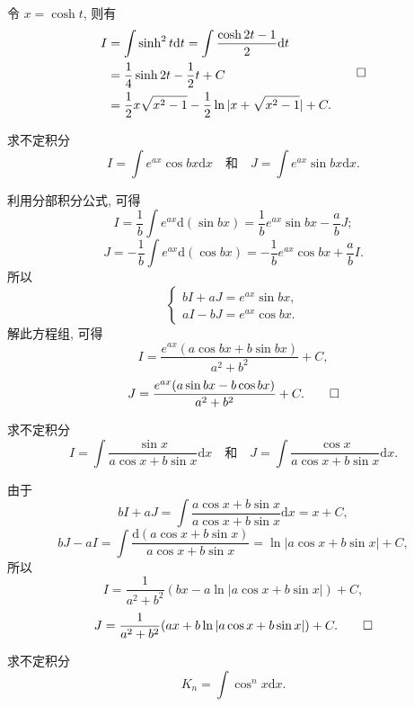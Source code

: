 \begin{solve}[{解法 2}]
令 $x=\cosh t$, 则有
\[
\begin{aligned}
  I
  &=
  \int\sinh^2t\mathrm dt
  =
  \int\frac{\cosh2t-1}{2}\mathrm dt\\
  &=
  \frac14\sinh2t-\frac12t+C\\
  &=
  \frac12x\sqrt{x^2-1}-\frac12\ln|x+\sqrt{x^2-1}|+C.
\end{aligned}
\qedhere
\]
\end{solve}


\begin{example}\label{example:ma-6-2-22}
求不定积分
\[
  I=\int e^{ax}\cos bx\mathrm dx
  \quad\text{和}\quad
  J=\int e^{ax}\sin bx\mathrm dx.
\]
\end{example}


\begin{solve}
利用分部积分公式, 可得
\[
  I=\frac1b\int e^{ax}\mathrm d(\sin bx)
  =
  \frac1be^{ax}\sin bx-\frac abJ;
\]
\[
  J=-\frac1b\int e^{ax}\mathrm d(\cos bx)
  =
  -\frac1be^{ax}\cos bx+\frac abI.
\]
所以
\[
  \begin{cases}
    bI+aJ=e^{ax}\sin bx,\\
    aI-bJ=e^{ax}\cos bx.
  \end{cases}
\]
解此方程组, 可得
\[
  I=\frac{e^{ax}(a\cos bx+b\sin bx)}{a^2+b^2}+C,
\]
\[
  J=\frac{e^{ax}(a\sin bx-b\cos bx)}{a^2+b^2}+C.
\qedhere
\]
\end{solve}


\begin{example}\label{example:ma-6-2-23}
求不定积分
\[
  I=\int\frac{\sin x}{a\cos x+b\sin x}\mathrm dx
  \quad\text{和}\quad
  J=\int\frac{\cos x}{a\cos x+b\sin x}\mathrm dx.
\]
\end{example}


\begin{solve}
由于
\[
  bI+aJ=
  \int\frac{a\cos x+b\sin x}{a\cos x+b\sin x}\mathrm dx
  =
  x+C,
\]
\[
  bJ-aI=
  \int\frac{\mathrm d(a\cos x+b\sin x)}{a\cos x+b\sin x}
  =
  \ln|a\cos x+b\sin x|+C,
\]
所以
\[
  I=\frac1{a^2+b^2}(bx-a\ln|a\cos x+b\sin x|)+C,
\]
\[
  J=\frac1{a^2+b^2}(ax+b\ln|a\cos x+b\sin x|)+C.
\qedhere
\]
\end{solve}


\begin{example}\label{example:ma-6-2-24}
求不定积分
\[
  K_n=\int\cos^nx\mathrm dx.
\]
\end{example}


